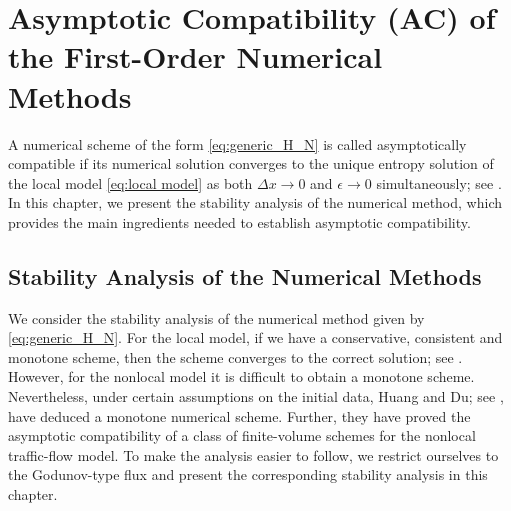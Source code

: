 
\chapter{Asymptotic Compatibility (AC) of the First-Order Numerical Methods}\label{chap:chapter_4}
A numerical scheme of the form \eqref{eq:generic_H_N} is called asymptotically compatible if its numerical solution converges to the unique entropy solution of the local model \eqref{eq:local model} as both \(\Delta x \to 0\) and \(\epsilon \to 0\) simultaneously; see \cite{tianAsymptoticallyCompatibleSchemes2014}. In this chapter, we present the stability analysis of the numerical method, which provides the main ingredients needed to establish asymptotic compatibility.

\section{Stability Analysis of the Numerical Methods}
We consider the stability analysis of the numerical method given by \eqref{eq:generic_H_N}. For the local model, if we have a conservative, consistent and monotone scheme, then the scheme converges to the correct solution; see \cite[Chapter~4]{Ulrik2015}. However, for the nonlocal model it is difficult to obtain a monotone scheme. Nevertheless, under certain assumptions on the initial data, Huang and Du; see \cite{huangAsymptoticCompatibilityClass2024}, have deduced a monotone numerical scheme. Further, they have proved the asymptotic compatibility of a class of finite-volume schemes for the nonlocal traffic-flow model. To make the analysis easier to follow, we restrict ourselves to the Godunov-type flux and present the corresponding stability analysis in this chapter.

